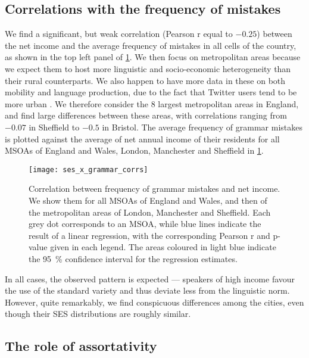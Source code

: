 \documentclass[../thesis.tex]{subfiles}
\begin{document}
\subsection{Correlations with the frequency of mistakes}
We find a significant, but weak correlation (Pearson r equal to $-0.25$) between the net
income and the average frequency of mistakes in all cells of the country, as shown in
the top left panel of \cref{fig:ses_x_grammar_corrs}. We then focus on metropolitan
areas because we expect them to host more linguistic and socio-economic heterogeneity
than their rural counterparts. We also happen to have more data in these on both
mobility and language production, due to the fact that Twitter users tend to be more
urban \cite{MisloveUnderstandingDemographics2011}. We therefore consider the $8$ largest
metropolitan areas in England, and find large differences between these areas, with
correlations ranging from $-0.07$ in Sheffield to $-0.5$ in Bristol. The average frequency
of grammar mistakes is plotted against the average of net annual income of their
residents for all \acp{MSOA} of England and Wales, London, Manchester and Sheffield in
\cref{fig:ses_x_grammar_corrs}.
\begin{figure}
\centering
  \texttt{[image: ses\_x\_grammar\_corrs]}
  \caption{ Correlation between frequency of grammar mistakes and net income. We show
  them for all \acp{MSOA} of England and Wales, and then of the metropolitan areas of
  London, Manchester and Sheffield. Each grey dot corresponds to an \ac{MSOA}, while
  blue lines indicate the result of a linear regression, with the corresponding Pearson
  r and p-value given in each legend. The areas coloured in light blue indicate the
  \SI{95}{\percent} confidence interval for the regression estimates.}
  \label{fig:ses_x_grammar_corrs}
\end{figure}
In all cases, the observed pattern is expected --- speakers of high income favour the
use of the standard variety and thus deviate less from the linguistic norm. However,
quite remarkably, we find conspicuous differences among the cities, even though their
\ac{SES} distributions are roughly similar. 


\subsection{The role of assortativity}
\end{document}
